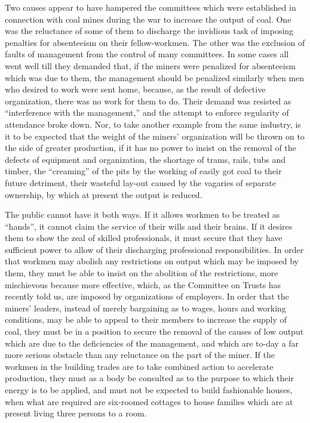 \documentclass{book}
\begin{document}
Two causes appear to have hampered the committees which were established in connection with coal mines during the war to increase the output of coal. One was the reluctance of some of them to discharge the invidious task of imposing penalties for absenteeism on their fellow-workmen. The other was the exclusion of faults of management from the control of many committees. In some cases all went well till they demanded that, if the miners were penalized for absenteeism which was due to them, the management should be penalized similarly when men who desired to work were sent home, because, as the result of defective organization, there was no work for them to do. Their demand was resisted as “interference with the management,” and the attempt to enforce regularity of attendance broke down. Nor, to take another example from the same industry, is it to be expected that the weight of the miners’ organization will be thrown on to the side of greater production, if it has no power to insist on the removal of the defects of equipment and organization, the shortage of trams, rails, tubs and timber, the “creaming” of the pits by the working of easily got coal to their future detriment, their wasteful lay-out caused by the vagaries of separate ownership, by which at present the output is reduced.

The public cannot have it both ways. If it allows workmen to be treated as “hands”, it cannot claim the service of their wills and their brains. If it desires them to show the zeal of skilled professionals, it must secure that they have sufficient power to allow of their discharging professional responsibilities. In order that workmen may abolish any restrictions on output which may be imposed by them, they must be able to insist on the abolition of the restrictions, more mischievous because more effective, which, as the Committee on Trusts has recently told us, are imposed by organizations of employers. In order that the miners’ leaders, instead of merely bargaining as to wages, hours and working conditions, may be able to appeal to their members to increase the supply of coal, they must be in a position to secure the removal of the causes of low output which are due to the deficiencies of the management, and which are to-day a far more serious obstacle than any reluctance on the part of the miner. If the workmen in the building trades are to take combined action to accelerate production, they must as a body be consulted as to the purpose to which their energy is to be applied, and must not be expected to build fashionable houses, when what are required are six-roomed cottages to house families which are at present living three persons to a room.
\end{document}
